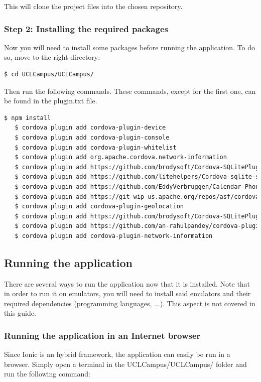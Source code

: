 \documentclass{eplmastersthesis}
\begin{document}
This will clone the project files into the chosen repository.

\subsubsection{Step 2: Installing the required packages}

Now you will need to install some packages before running the application. To do so, move to the right directory:

\begin{lstlisting}[language=bash]
   $ cd UCLCampus/UCLCampus/
\end{lstlisting}
Then run the following commands. These commands, except for the first one, can be found in the plugin.txt file.
\begin{lstlisting}[language=bash]
   $ npm install
   $ cordova plugin add cordova-plugin-device
   $ cordova plugin add cordova-plugin-console
   $ cordova plugin add cordova-plugin-whitelist
   $ cordova plugin add org.apache.cordova.network-information
   $ cordova plugin add https://github.com/brodysoft/Cordova-SQLitePlugin.git
   $ cordova plugin add https://github.com/litehelpers/Cordova-sqlite-storage.git
   $ cordova plugin add https://github.com/EddyVerbruggen/Calendar-PhoneGap-Plugin.git
   $ cordova plugin add https://git-wip-us.apache.org/repos/asf/cordova-plugin-inappbrowser.git
   $ cordova plugin add cordova-plugin-geolocation
   $ cordova plugin add https://github.com/brodysoft/Cordova-SQLitePlugin.git
   $ cordova plugin add https://github.com/an-rahulpandey/cordova-plugin-dbcopy.git
   $ cordova plugin add cordova-plugin-network-information
\end{lstlisting}

\subsection{Running the application}

There are several ways to run the application now that it is installed. Note that in order to run it on emulators, you will need to install said emulators and their required dependencies (programming languages, ...). This aspect is not covered in this guide.

\subsubsection{Running the application in an Internet browser}

Since Ionic is an hybrid framework, the application can easily be run in a browser. Simply open a terminal in the UCLCampus/UCLCampus/ folder and run the following command:
\end{document}
